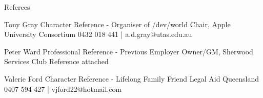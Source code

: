 \begin{tmrsection}{Referees}

  \tmrshortentry
  	{Tony Gray}
  	{Character Reference - Organiser of /dev/world}
  	{Chair, Apple University Consortium}
  	{0432 018 441 | a.d.gray@utas.edu.au}
  	
  \tmrshortentry
    {Peter Ward}
    {Professional Reference - Previous Employer}
    {Owner/GM, Sherwood Services Club}
    {Reference attached}
    
  \tmrshortentry
    {Valerie Ford}
    {Character Reference - Lifelong Family Friend}
    {Legal Aid Queensland}
    {0407 594 427 | vjford22@hotmail.com}
	
\end{tmrsection}
